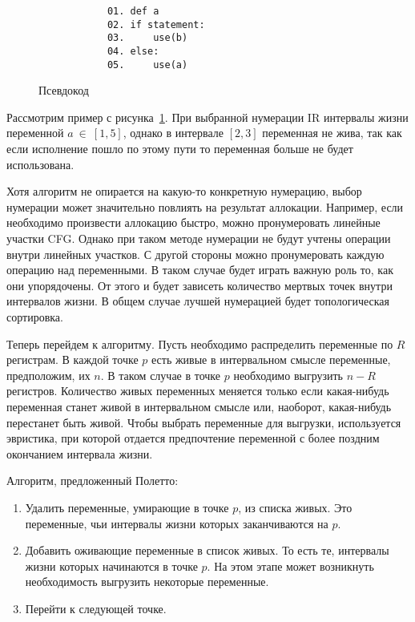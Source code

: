 \begin{example}
    \begin{figure}[h]
        \centering
        \lstset{basicstyle=\ttfamily\small, frame=single}
        \begin{lstlisting}
            01. def a
            02. if statement:
            03.     use(b)
            04. else:
            05.     use(a)
        \end{lstlisting}
        \caption{Псевдокод}
        \label{fig:example_live_intervals}
    \end{figure}

    Рассмотрим пример с рисунка~\ref{fig:example_live_intervals}. При выбранной нумерации IR интервалы жизни переменной
    $a~\in~[1,5]$, однако в интервале $[2,3]$ переменная не жива, так как если исполнение пошло по этому пути
    то переменная больше не будет использована.
    
\end{example}

Хотя алгоритм не опирается на какую-то конкретную нумерацию,
выбор нумерации может значительно повлиять на результат аллокации.
Например, если необходимо произвести аллокацию быстро,
можно пронумеровать линейные участки CFG.
Однако при таком методе нумерации не будут учтены операции внутри линейных участков.
С другой стороны можно пронумеровать каждую операцию над переменными.
В таком случае будет играть важную роль то,
как они упорядочены.
От этого и будет зависеть количество мертвых точек внутри интервалов жизни.
В общем случае лучшей нумерацией будет топологическая сортировка.

Теперь перейдем к алгоритму. Пусть необходимо распределить переменные по $R$ регистрам. В каждой точке
$p$ есть живые в интервальном смысле переменные, предположим, их $n$. В таком случае в точке $p$
необходимо выгрузить $n - R$ регистров. Количество живых переменных меняется только если какая-нибудь
переменная станет живой в интервальном смысле или, наоборот, какая-нибудь перестанет быть живой.
Чтобы выбрать переменные для выгрузки, используется эвристика,
при которой отдается предпочтение переменной с более поздним окончанием интервала жизни.

Алгоритм, предложенный Полетто:

\begin{enumerate}
    \item Удалить переменные, умирающие в точке $p$, из списка живых.
    Это переменные, чьи интервалы жизни которых заканчиваются на $p$. \label{poleto_alg:delete_death}

    \item Добавить оживающие переменные в список живых.
    То есть те, интервалы жизни которых начинаются в точке $p$.
    На этом этапе может возникнуть необходимость выгрузить некоторые переменные. \label{poleto_alg:add_alive}

    \item Перейти к следующей точке.
\end{enumerate}

